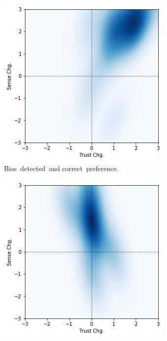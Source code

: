 \begin{figure}
\centering
\begin{subfigure}{0.45\linewidth}
\includegraphics[width=\linewidth]{aggexplain/stats/tvss-chg-correct}%
\caption{\centering Bias~detected~and correct~preference.}
\label{subfig:tvss-chg-a}
\end{subfigure}%
\hfill%
\begin{subfigure}{0.45\linewidth}
\includegraphics[width=\linewidth]{aggexplain/stats/tvss-chg-change}%

\end{subfigure}
\end{figure}
